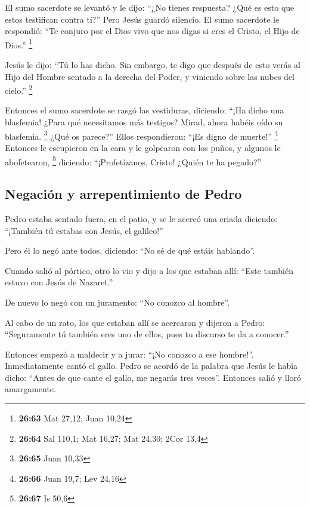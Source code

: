 \begin{paracol}{2}
 El sumo sacerdote se levantó y le dijo: ``¿No tienes
respuesta? ¿Qué es esto que estos testifican contra ti?''
 Pero Jesús guardó silencio. El sumo sacerdote le
respondió: ``Te conjuro por el Dios vivo que nos digas si eres el
Cristo, el Hijo de Dios.'' \footnote{\textbf{26:63} Mat 27,12; Juan
  10,24}

 Jesús le dijo: ``Tú lo has dicho. Sin embargo, te digo
que después de esto verás al Hijo del Hombre sentado a la derecha del
Poder, y viniendo sobre las nubes del cielo.'' \footnote{\textbf{26:64}
  Sal 110,1; Mat 16,27; Mat 24,30; 2Cor 13,4}

 Entonces el sumo sacerdote se rasgó las vestiduras,
diciendo: ``¡Ha dicho una blasfemia! ¿Para qué necesitamos más testigos?
Mirad, ahora habéis oído su blasfemia. \footnote{\textbf{26:65} Juan
  10,33}  ¿Qué os parece?'' Ellos respondieron: ``¡Es
digno de muerte!'' \footnote{\textbf{26:66} Juan 19,7; Lev 24,16}
 Entonces le escupieron en la cara y le golpearon con los
puños, y algunos le abofetearon, \footnote{\textbf{26:67} Is 50,6}
 diciendo: ``¡Profetízanos, Cristo! ¿Quién te ha
pegado?''

\hypertarget{negaciuxf3n-y-arrepentimiento-de-pedro}{%
\subsection{Negación y arrepentimiento de
Pedro}\label{negaciuxf3n-y-arrepentimiento-de-pedro}}

 Pedro estaba sentado fuera, en el patio, y se le acercó
una criada diciendo: ``¡También tú estabas con Jesús, el galileo!''

 Pero él lo negó ante todos, diciendo: ``No sé de qué
estáis hablando''.

 Cuando salió al pórtico, otro lo vio y dijo a los que
estaban allí: ``Este también estuvo con Jesús de Nazaret.''

 De nuevo lo negó con un juramento: ``No conozco al
hombre''.

 Al cabo de un rato, los que estaban allí se acercaron y
dijeron a Pedro: ``Seguramente tú también eres uno de ellos, pues tu
discurso te da a conocer.''

 Entonces empezó a maldecir y a jurar: ``¡No conozco a
ese hombre!''. Inmediatamente cantó el gallo.  Pedro se
acordó de la palabra que Jesús le había dicho: ``Antes de que cante el
gallo, me negarás tres veces''. Entonces salió y lloró amargamente.


\end{paracol}
